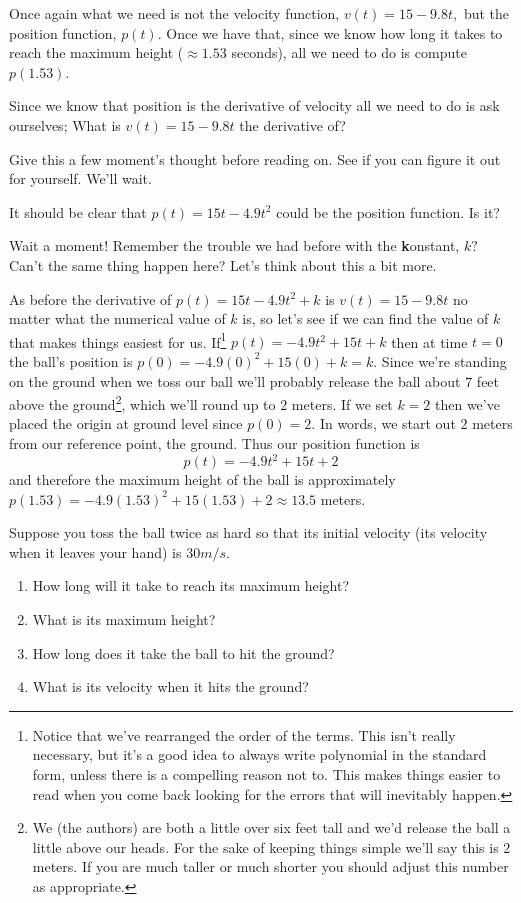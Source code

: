 Once again what we need is not the velocity function, $v(t) =15-9.8t,$
but the position function, $p(t).$ Once we have that, since we know
how long it takes to reach the maximum height ($\approx 1.53$
seconds), all we need to do is compute $p(1.53).$

Since we know that position is the derivative of velocity all we need
to do is ask ourselves; What is $v(t) = 15-9.8t$ the derivative of?

\begin{ProficiencyDrill}
  Give this a few moment's thought before reading on. See if you can
  figure it out for yourself. We'll wait. 
\end{ProficiencyDrill}

It should be clear that $p(t) = 15t-4.9t^2$ could  be the  position
function. 
Is it?


Wait a moment! Remember the trouble we had before with the
{\bf{}k}onstant, $k?$ Can't the same thing happen here? Let's think
about this a bit more.

As before the derivative of $ p(t) = 15t-4.9t^2 +k $ is
$ v(t) =15-9.8t $ no matter what the numerical value of $k$ is, so
let's see if we can find the value of $k$ that makes things easiest
for us. If\footnote{Notice that we've rearranged the order of the
  terms. This isn't really necessary, but it's a good idea to always
  write polynomial in the standard form, unless there is a compelling
  reason not to. This makes things easier to read when you come back
  looking for the errors that will inevitably happen.}
$p(t) = -4.9t^2+15t +k$ then at time $t=0$ the ball's position is
$p(0) = -4.9(0)^2+15(0) +k = k.$ Since we're standing on the ground
when we toss our ball we'll probably release the ball about $7$ feet
above the ground\footnote{We (the authors) are both a little over six
  feet tall and we'd release the ball a little above our heads. For
  the sake of keeping things simple we'll say this is $2$ meters. If
  you are much taller or much shorter you should adjust this number as
  appropriate.}, which we'll round up to  $2$ meters. If we set $k=2$ then we've
placed the origin at ground level since $p(0)=2$. In words, we start
out $2$ meters from our reference point, the ground. Thus our
position function is
$$
p(t) = -4.9t^2+15t +  2
$$
and therefore the maximum height of the ball is approximately $p(1.53) =
-4.9(1.53)^2+15(1.53) +  2 \approx 13.5$ meters.

\begin{embeddedproblem}{}
  Suppose you toss the ball twice as hard so that its initial velocity
  (its velocity when it leaves your hand) is $30 m/s.$ 
  \begin{enumerate}[label={\bf{}(\alph*)}]{}
  \item How long will it take to reach its maximum height?
  \item What is its maximum height?
  \item How long does it take the ball to hit the ground?
  \item What is its velocity when it hits the ground?
  \end{enumerate}
\end{embeddedproblem}

